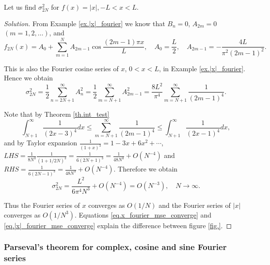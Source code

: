 \begin{example}[]
Let us find $\sigma_{2 N}^2$ for $f(x)=|x|,-L<x<L$.
\end{example}
\begin{proof}[Solution]
From Example \ref{ex.|x|_fourier} we know that $B_n=0$, $A_{2 m}=0$ $(m=1,2, \ldots)$, and
$$
f_{2 N}(x)=A_0+\sum_{m=1}^N A_{2 m-1} \cos \frac{(2 m-1) \pi x}{L}, \quad A_0=\frac{L}{2}, \quad A_{2 m-1}=-\frac{4 L}{\pi^2(2 m-1)^2} .
$$

This is also the Fourier cosine series of $x$, $0<x<L$, in Example \ref{ex.|x|_fourier}. Hence we obtain
$$
\sigma_{2 N}^2=\frac{1}{2} \sum_{n=2 N+1}^{\infty} A_n^2=\frac{1}{2} \sum_{m=N+1}^{\infty} A_{2 m-1}^2=\frac{8 L^2}{\pi^4} \sum_{m=N+1}^{\infty} \frac{1}{(2 m-1)^4} .
$$

Note that by Theorem \ref{th.int_test}
$$
\int_{N+1}^{\infty} \frac{1}{(2 x-3)^4} d x \leq \sum_{m=N+1}^{\infty} \frac{1}{(2 m-1)^4} \leq \int_{N+1}^{\infty} \frac{1}{(2 x-1)^4} d x,
$$
and by Taylor expansion $\frac{1}{(1+x)^3} = 1 - 3x + 6x^2 + \cdots$, $\textit{LHS} = \frac{1}{8N^3}\frac{1}{(1+1/2N)^3}=\frac{1}{6(2 N+1)^3}=\frac{1}{48 N^3}+O\left(N^{-4}\right)$ and $\textit{RHS}=\frac{1}{6(2 N-1)^3}=\frac{1}{48 N^3}+O\left(N^{-4}\right)$.
Therefore we obtain
\begin{equation}\label{eq.|x|_fourier_mse_converge}
    \sigma_{2 N}^2=\frac{L^2}{6 \pi^4 N^3}+O\left(N^{-4}\right)=O\left(N^{-3}\right), \quad N \rightarrow \infty .
\end{equation}

Thus the Fourier series of $x$ converges as $O(1 / N)$ and the Fourier series of $|x|$ converges as $O\left(1 / N^3\right)$. Equations \eqref{eq.x_fourier_mse_converge} and \eqref{eq.|x|_fourier_mse_converge} explain the difference between figure \ref{fig.}.
\end{proof}

\subsubsection{Parseval's theorem for complex, cosine and sine Fourier series}


